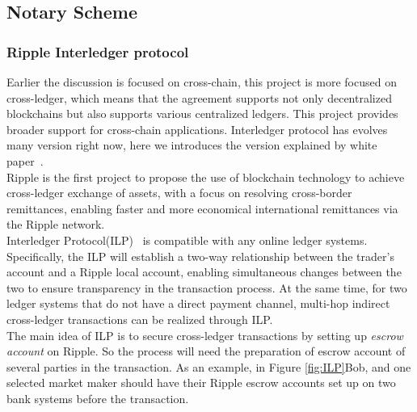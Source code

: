 \subsection{Notary Scheme}
\label{sec:notary}
\subsubsection{Ripple Interledger protocol}
\label{subsec:interledger}
\noindent Earlier the discussion is focused on cross-chain, this project is more focused on cross-ledger, which means that the agreement supports not only decentralized blockchains but also supports various centralized ledgers. This project provides broader support for cross-chain applications. Interledger protocol has evolves many version right now, here we introduces the version explained by white paper~\cite{thomas2015protocol}.\\

\noindent Ripple is the first project to propose the use of blockchain technology to achieve cross-ledger exchange of assets, with a focus on resolving cross-border remittances, enabling faster and more economical international remittances via the Ripple network.\\

\noindent Interledger Protocol(ILP)~\cite{thomas2015protocol} is compatible with any online ledger systems. Specifically, the ILP will establish a two-way relationship between the trader's account and a Ripple local account, enabling simultaneous changes between the two to ensure transparency in the transaction process. At the same time, for two ledger systems that do not have a direct payment channel, multi-hop indirect cross-ledger transactions can be realized through ILP. \\

\noindent The main idea of ILP is to secure cross-ledger transactions by setting up \textit{escrow account} on Ripple. So the process will need the preparation of escrow account of several parties in the transaction. As an example, in Figure \ref{fig:ILP}Bob, and one selected market maker should have their Ripple escrow accounts set up on two bank systems before the transaction. \\

